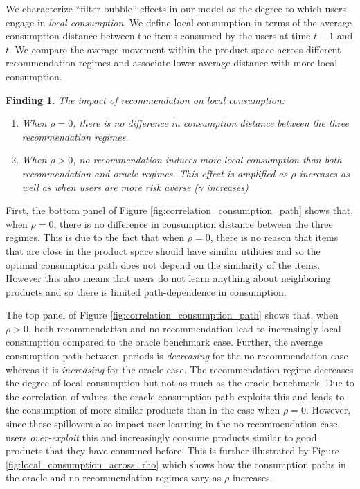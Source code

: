 \documentclass[sigconf, anonymous, review]{acmart}
\newtheorem{finding}{Finding}
\begin{document}
We characterize ``filter bubble'' effects in our model as the degree to which users engage in \textit{local consumption}. We define local consumption in terms of the average consumption distance between the items consumed by the users at time $t-1$ and $t$. We compare the average movement within the product space across different recommendation regimes and associate lower average distance with more local consumption.

\begin{finding}\label{finding_local_consumption}
The impact of recommendation on local consumption:
\begin{enumerate}
\item When $\rho = 0$, there is no difference in consumption distance between the three recommendation regimes.
\item When $\rho > 0$, no recommendation induces more local consumption than both recommendation and oracle regimes. This effect is amplified as $\rho$ increases as well as when users are more risk averse ($\gamma$ increases)
\end{enumerate}
\end{finding}

First, the bottom panel of Figure \ref{fig:correlation_consumption_path} shows that, when $\rho = 0$, there is no difference in consumption distance between the three regimes. This is due to the fact that when $\rho = 0$, there is no reason that items that are close in the product space should have similar utilities and so the optimal consumption path does not depend on the similarity of the items. However this also means that users do not learn anything about neighboring products and so there is limited path-dependence in consumption.
\par

The top panel of Figure \ref{fig:correlation_consumption_path} shows that, when $\rho > 0$, both recommendation and no recommendation lead to increasingly local consumption compared to the oracle benchmark case. Further, the average consumption path between periods is \textit{decreasing} for the no recommendation case whereas it is \textit{increasing} for the oracle case. The recommendation regime decreases the degree of local consumption but not as much as the oracle benchmark. Due to the correlation of values, the oracle consumption path exploits this and leads to the consumption of more similar products than in the case when $\rho = 0$. However, since these spillovers also impact user learning in the no recommendation case, users \textit{over-exploit} this and increasingly consume products similar to good products that they have consumed before. This is further illustrated by Figure \ref{fig:local_consumption_across_rho} which shows how the consumption paths in the oracle and no recommendation regimes vary as $\rho$ increases.
\par
\end{document}
